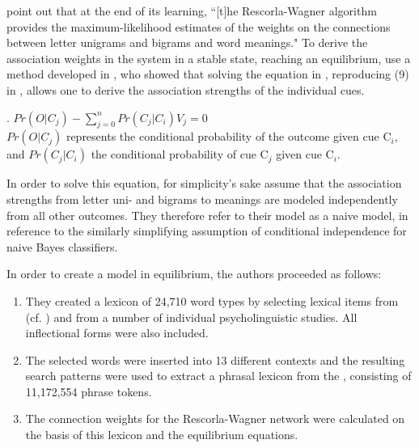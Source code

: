 \citet[450]{Baayenetal:2011} point out that at the end of its
learning, ``[t]he Rescorla-Wagner algorithm provides the
maximum-likelihood estimates of the weights on the connections between
letter unigrams and bigrams and word meanings."
To derive the association weights in the system in a stable state,
reaching an equilibrium, \citet{Baayenetal:2011} use a method
developed in \citet{Danks:2003}, who showed that solving the equation
in \Next, reproducing (9) in \citet{Baayenetal:2011}, allows one to derive the association strengths of the individual
cues.

\ex.
\( \displaystyle Pr(O|C_j) - \sum_{j=0}^{n}{Pr(C_j|C_i)V_j} = 0 \)  
\\ $Pr(O|C_j)$ represents the conditional probability of the outcome
given cue C$_i$, and $Pr(C_j|C_i)$ the conditional probability of
cue C$_j$ given cue C$_i$. 

In order to solve this equation, \citet{Baayenetal:2011} for
simplicity's sake assume that the association strengths from letter
uni- and bigrams to meanings are modeled independently from all other
outcomes. They therefore refer to their model as a naive model, in
reference to the similarly simplifying assumption of conditional
independence for naive Bayes classifiers.

In order to create a model in equilibrium, the authors proceeded as
follows:
\begin{enumerate}
\item They created a lexicon of 24,710 word types by selecting lexical
  items from  (cf. \citealt{Baayenetal:1995}) and from a number of
  individual psycholinguistic studies. All inflectional forms were
  also included.
\item The selected words were inserted into 13 different contexts and
  the resulting search patterns were used to extract a phrasal lexicon
  from the , consisting of 11,172,554 phrase tokens.
\item The connection weights for the Rescorla-Wagner network were
  calculated on the basis of this lexicon and the equilibrium equations.
\end{enumerate}

